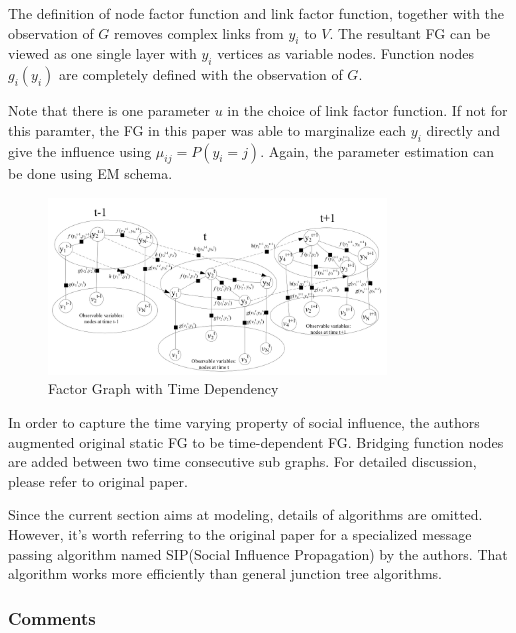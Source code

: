 The definition of node factor function and link factor function, together 
with the observation of $G$ removes complex links from $y_i$ to $V$. The 
resultant FG can be viewed as one single layer with $y_i$ vertices 
as variable nodes. Function nodes $g_i(y_i)$ are completely defined 
with the observation of $G$. 

Note that there is one parameter $u$ in the choice of 
link factor function. If not for this paramter, the FG in this paper
was able to marginalize each $y_i$ directly and give the influence 
using $\mu_{ij} = P(y_i=j)$. Again, the parameter estimation can be done
using EM schema. 

\begin{figure}[htb]
\centering
	\includegraphics[width=0.8\textwidth]{fig/wang2011-FG-dynamic.png}
	\caption{Factor Graph with Time Dependency}
\end{figure}

In order to capture the time varying property of social influence, the 
authors augmented original static FG to be time-dependent FG. Bridging 
function nodes are added between two time consecutive sub graphs. For 
detailed discussion, please refer to original paper. 

Since the current section aims at modeling, details of algorithms are 
omitted. However, it's worth referring to the original paper for 
a specialized message passing algorithm named SIP(Social Influence 
Propagation) by the authors. That algorithm works more efficiently 
than general junction tree algorithms. 

\subsubsection{Comments}

